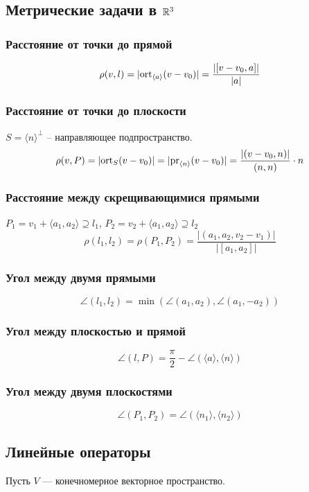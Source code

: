 \subsection*{Метрические задачи в $\mathbb{R}^3$}
%
\subsubsection*{Расстояние от точки до прямой}
\[
\rho(v, l) = |\mathrm{ort}_{\langle a \rangle}(v - v_0)| = \frac{|[v - v_0, a]|}{|a|}
\]
\subsubsection*{Расстояние от точки до плоскости}
$S = \langle n \rangle^{\perp}$ -- направляющее подпространство.
\[
\rho(v, P) = |\mathrm{ort}_{S}(v - v_0)| = |\mathrm{pr}_{\langle n \rangle}(v - v_0)| = \frac{|(v - v_0, n)|}{(n, n)}\cdot n
\]
\subsubsection*{Расстояние между скрещивающимися прямыми}
$P_1 = v_1 + \langle a_1, a_2 \rangle \supseteq l_1$, $P_2 = v_2 + \langle a_1, a_2 \rangle \supseteq l_2$
\[
\rho(l_1, l_2) = \rho(P_1, P_2) = \frac{|(a_1, a_2, v_2 - v_1)|}{|[a_1, a_2]|}
\]
\subsubsection*{Угол между двумя прямыми}
\[
\angle(l_1, l_2) = \min(\angle(a_1, a_2), \angle(a_1, -a_2))
\]
\subsubsection*{Угол между плоскостью и прямой}
\[
\angle(l, P) = \frac{\pi}{2} - \angle(\langle a \rangle, \langle n \rangle)
\]
\subsubsection*{Угол между двумя плоскостями}
\[
\angle(P_1, P_2) = \angle(\langle n_1 \rangle, \langle n_2 \rangle)
\]

\subsection*{Линейные операторы}
%
Пусть $V$ --- конечномерное векторное пространство.

